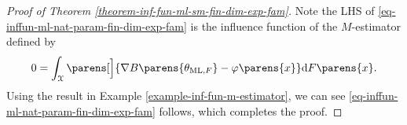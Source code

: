 \begin{proof}[Proof of Theorem \ref{theorem-inf-fun-ml-sm-fin-dim-exp-fam}]
	Note the LHS of \eqref{eq-inffun-ml-nat-param-fin-dim-exp-fam} is the influence function of the $M$-estimator defined by 
	\begin{align*}
		0 = \int_{\calX} \parens[\Big]{\nabla B \parens{\theta_{\ML, F}} - \varphi \parens{x}} \diff F \parens{x}. 
	\end{align*}
	Using the result in Example \ref{example-inf-fun-m-estimator}, we can see \eqref{eq-inffun-ml-nat-param-fin-dim-exp-fam} follows, which completes the proof. 
	
	

\end{proof}
